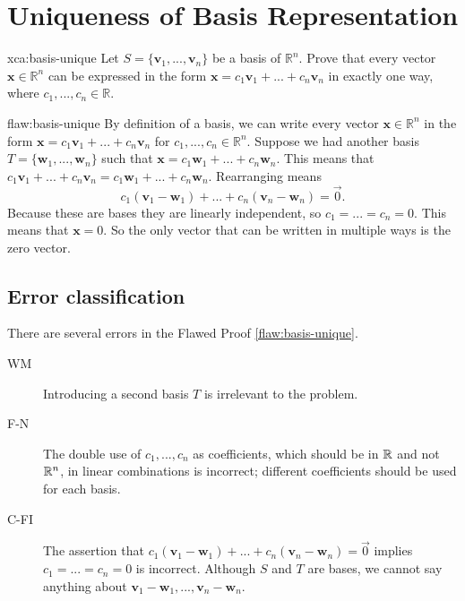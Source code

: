 \section{Uniqueness of Basis Representation}

\begin{xca}{xca:basis-unique}
Let $S = \{\bm{v}_1, ..., \bm{v}_n\}$ be a basis of $\mathbb{R}^n$. Prove that every vector $\bm{x}\in \mathbb{R}^n$ can be expressed in the form $\bm{x} = c_1\bm{v}_1+ ...+ c_n\bm{v}_n$ in exactly one way, where $c_1, ..., c_n \in \mathbb{R}$.
\end{xca}

\begin{flaw}{flaw:basis-unique} %
By definition of a basis, we can write every vector $\bm{x} \in \mathbb{R}^n$ in the form $\bm{x} = c_1\bm{v}_1+ ...+ c_n\bm{v}_n$ for $c_1, ..., c_n \in \mathbb{R}^n$. Suppose we had another basis $T = \{\bm{w}_1, ..., \bm{w}_n\}$  such that $\bm{x} = c_1\bm{w}_1+ ...+ c_n\bm{w}_n$. This means that $c_1\bm{v}_1+ ...+ c_n\bm{v}_n = c_1\bm{w}_1+ ...+ c_n\bm{w}_n $. Rearranging means \[c_1(\bm{v}_1-\bm{w}_1)+...+c_n(\bm{v}_n-\bm{w}_n) = \vec{0}.\] Because these are bases they are linearly independent, so $c_1 = ... = c_n = 0$. This means that $\bm{x} = 0$. So the only vector that can be written in multiple ways is the zero vector.
\end{flaw}

\clearpage
\subsection{Error classification}

There are several errors in the Flawed Proof \ref{flaw:basis-unique}.


 \begin{description}
    \item[WM] Introducing a second basis $T$ is irrelevant to the problem.
    \item[F-N ] The double use of $c_1, ..., c_n$ as coefficients, which should be in $\mathbb R$ and not $\mathbb R^n$, in linear combinations is incorrect; different coefficients should be used for each basis.
    \item[C-FI] The assertion that $c_1(\bm{v}_1-\bm{w}_1)+...+c_n(\bm{v}_n-\bm{w}_n) = \vec{0}$ implies $c_1=...=c_n=0$ is incorrect. Although $S$ and $T$ are bases, we cannot say anything about $\bm{v}_1-\bm{w}_1, ..., \bm{v}_n-\bm{w}_n$.
 	
 \end{description}


